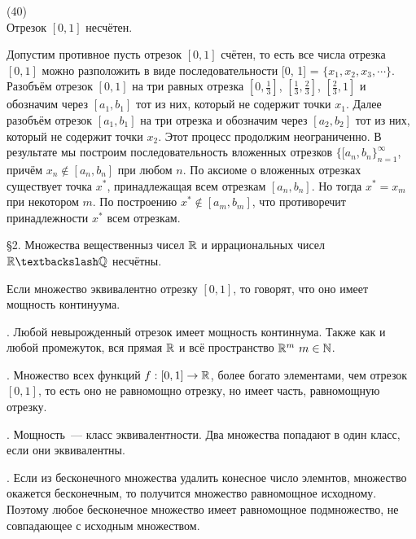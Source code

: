 (40)\\
\T Отрезок $[0, 1]$ несчётен.

\D Допустим противное пусть отрезок $[0, 1]$ счётен, то есть все числа отрезка $[0, 1]$ можно разположить в виде последовательности [0, 1] = $\{x_1, x_2, x_3, \cdots\}$.\\
Разобъём отрезок $[0, 1]$ на три равных отрезка $[0, \frac{1}{3}]$, $[\frac{1}{3}, \frac{2}{3}]$, $[\frac{2}{3}, 1]$ и обозначим через $[a_1, b_1]$ тот из них, который не содержит точки $x_1$. Далее разобъём отрезок $[a_1, b_1]$ на три отрезка и обозначим через $[a_2, b_2]$ тот из них, который не содержит точки $x_2$. Этот процесс продолжим неограниченно. В результате мы построим последовательность вложенных отрезков $\{[a_n, b_n\}^\infty_{n = 1}$, причём $x_n\notin [a_n, b_n]$ при любом $n$. По аксиоме о вложенных отрезках существует точка $x^*$, принадлежащая всем отрезкам $[a_n, b_n]$. Но тогда $x^* = x_m$ при некотором $m$. По построению $x^* \notin [a_m, b_m]$, что противоречит принадлежности $x^*$ всем отрезкам.

\S2. Множества вещественныз чисел $\mathbb{R}$ и иррациональных чисел $\R \bsl \Q$ несчётны.

\Op Если множество эквивалентно отрезку $[0, 1]$, то говорят, что оно имеет мощность континуума.

. Любой невырожденный отрезок имеет мощность континнума. Также как и любой промежуток, вся прямая $\mathbb{R}$ и всё пространство $\mathbb{R}^m\ m \in \mathbb{N}$.

. Множество всех функций $f: [0, 1] \to \mathbb{R}$, более богато элементами, чем отрезок $[0, 1]$, то есть оно не равномощно отрезку, но имеет часть, равномощную отрезку.

. Мощность~--- класс эквивалентности. Два множества попадают в один класс, если они эквивалентны.

. Если из бесконечного множества удалить конесное число элемнтов, множество окажется бесконечным, то получится множество равномощное исходному. Поэтому любое бесконечное множество имеет равномощное подмножество, не совпадающее с исходным множеством.